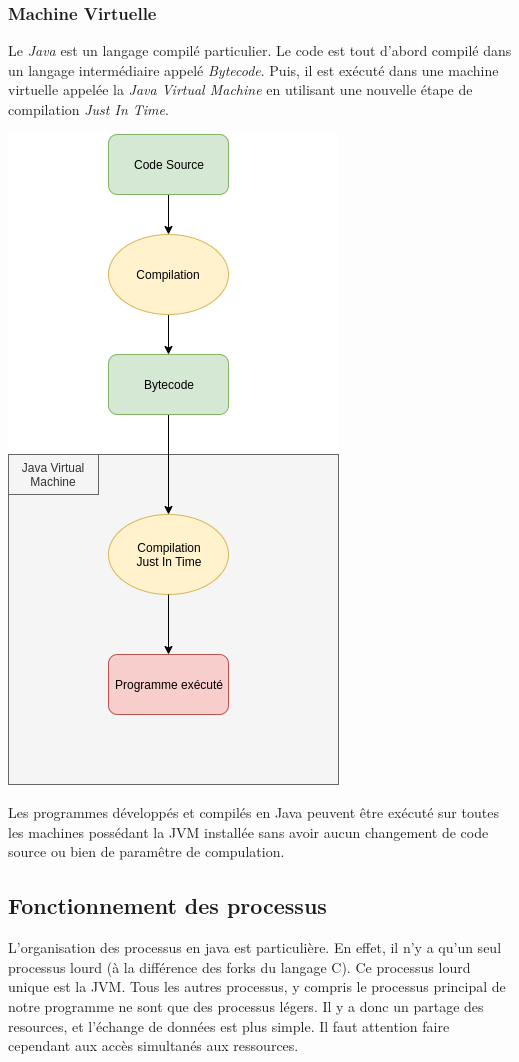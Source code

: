 \documentclass[a4paper, 12pt]{report}
\begin{document}
		\subsubsection{Machine Virtuelle}
			Le \emph{Java} est un langage compilé particulier. Le code est tout d'abord compilé dans un langage intermédiaire appelé \emph{Bytecode}. 
			Puis, il est exécuté dans une machine virtuelle appelée la \emph {Java Virtual Machine} en utilisant une nouvelle étape de compilation \emph {Just In Time}.
			\par
			\begin{center}
				\includegraphics[scale=0.5]{java_compilation.png}
			\end{center}
			Les programmes développés et compilés en Java peuvent être exécuté sur toutes les machines possédant la JVM installée sans avoir aucun changement de code source ou bien de paramêtre de compulation.
	\subsection{Fonctionnement des processus}
		L'organisation des processus en java est particulière. En effet, il n'y a qu'un seul processus lourd (à la différence des forks du langage C).
		Ce processus lourd unique est la JVM. Tous les autres processus, y compris le processus principal de notre programme ne sont que des processus légers.
		Il y a donc un partage des resources, et l'échange de données est plus simple. Il faut attention faire cependant aux accès simultanés aux ressources.
\end{document}
